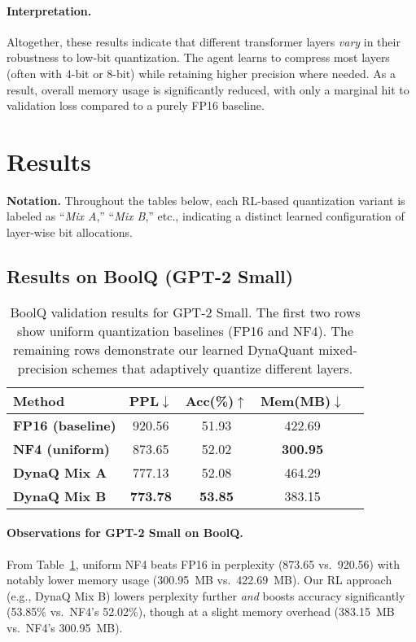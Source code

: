\documentclass{article}
\begin{document}
	\paragraph{Interpretation.}
	Altogether, these results indicate that different transformer layers \emph{vary} in their robustness to low-bit quantization. The agent learns to compress most layers (often with 4-bit or 8-bit) while retaining higher precision where needed. As a result, overall memory usage is significantly reduced, with only a marginal hit to validation loss compared to a purely FP16 baseline.
			
	
	\section{Results}
	
	\noindent
	\textbf{Notation.} 
	Throughout the tables below, each RL-based quantization variant is labeled as ``\textit{Mix A},'' ``\textit{Mix B},'' etc., indicating a distinct learned configuration of layer-wise bit allocations.
	
	\subsection{Results on BoolQ (GPT-2 Small)}
	
	\begin{table}[ht]
		\centering		
		\label{tab:boolq-small}
		\begin{tabular}{lcccc}
			\toprule
			\textbf{Method} & \textbf{PPL}$\downarrow$ & \textbf{Acc(\%)}$\uparrow$ & \textbf{Mem(MB)}$\downarrow$ \\
			\midrule
			\textbf{FP16 (baseline)}  & 920.56 & 51.93 & 422.69 \\
			\textbf{NF4 (uniform)}    & 873.65 & 52.02 & \textbf{300.95} \\
			\midrule
			\textbf{DynaQ Mix A}      & 777.13 & 52.08 & 464.29 \\
			\textbf{DynaQ Mix B}      & \textbf{773.78} & \textbf{53.85} & 383.15 \\
			\bottomrule
		\end{tabular}
		\caption{\small BoolQ validation results for GPT-2 Small. The first two rows show uniform quantization baselines (FP16 and NF4). The remaining rows demonstrate our learned DynaQuant mixed-precision schemes that adaptively quantize different layers.}
	\end{table}
	
	\paragraph{Observations for GPT-2 Small on BoolQ.}
	From Table~\ref{tab:boolq-small}, uniform NF4 beats FP16 in perplexity (873.65 vs.\ 920.56) with notably lower memory usage (300.95~MB vs.\ 422.69~MB). Our RL approach (e.g., DynaQ Mix B) lowers perplexity further \emph{and} boosts accuracy significantly (53.85\% vs.\ NF4's 52.02\%), though at a slight memory overhead (383.15~MB vs.\ NF4's 300.95~MB).
	
\end{document}
